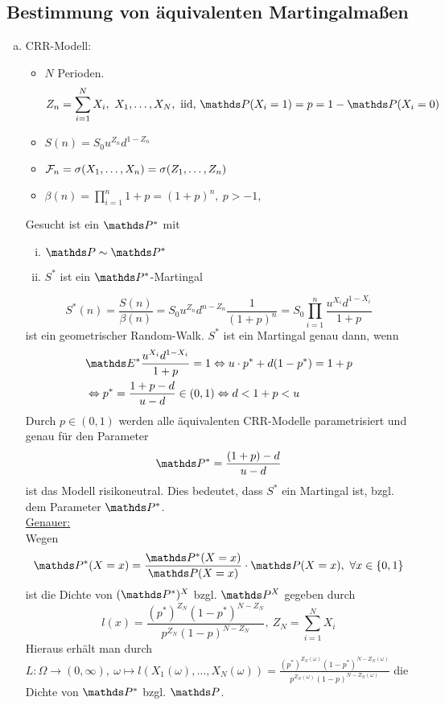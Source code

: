 
\subsection{Bestimmung von äquivalenten Martingalmaßen}
\label{sub:bestimmung_mmase}
\begin{enumerate}[(a)]
	\item CRR-Modell:
	\begin{itemize}
		\item $N$ Perioden.
		\[
		Z_n=\sum_{i=1}^{N}X_i,~X_1,\dots,X_N,\text{ iid, }\Pw(X_i=1)=p=1-\Pw(X_i=0)
		\]
		\item $S(n)=S_0u^{Z_n}d^{1-Z_n}$
		\item $\mathcal{F}_n=\sigma(X_1,\dots,X_n)=\sigma(Z_1,\dots,Z_n)$
		\item $\beta(n)=\prod_{i=1}^{n}1+p=(1+p)^n,~p>-1$,
	\end{itemize}
	Gesucht ist ein $\Pw^*$ mit 
	\begin{enumerate}[(i)]
		\item $\Pw \sim \Pw^*$
		\item $S^*$ ist ein $\Pw^*$-Martingal
	\end{enumerate}
	\[
	S^*(n)=\frac{S(n)}{\beta(n)}=S_0u^{Z_n}d^{n-Z_n}\frac{1}{(1+p)^n}=S_0\prod_{i=1}^{n}\frac{u^{X_i}d^{1-X_i}}{1+p}
	\]
	ist ein geometrischer Random-Walk.
	$S^*$ ist ein Martingal genau dann, wenn
	\begin{equation*}
	\begin{aligned}
		&\E^*\frac{u^{X_i}d^{1-X_i}}{1+p}=1 \Leftrightarrow u\cdot p^*+d(1-p^*)=1+p\\
		&\Leftrightarrow p^*=\frac{1+p-d}{u-d}\in (0,1) \Leftrightarrow d<1+p<u
	\end{aligned}
	\end{equation*}
	Durch $p\in(0,1)$ werden alle äquivalenten CRR-Modelle parametrisiert und genau für den Parameter
	\[
	\Pw^*=\frac{(1+p)-d}{u-d}
	\]
	ist das Modell risikoneutral.
	Dies bedeutet, dass $S^*$ ein Martingal ist, bzgl. dem Parameter $\Pw^*$.\\
	\uline{Genauer:}\\
	Wegen 
	\[
	\Pw^*(X=x)=\frac{\Pw^*(X=x)}{\Pw(X=x)}\cdot \Pw(X=x),~\forall x\in \{0,1\}
	\]
	ist die Dichte von $(\Pw^*)^X$ bzgl. $\Pw^X$ gegeben durch
	\[
	l(x)=\frac{(p^*)^{Z_N}(1-p^*)^{N-Z_N}}{p^{Z_N}(1-p)^{N-Z_N}},~Z_N=\sum_{i=1}^{N}X_i
	\]
	Hieraus erhält man durch $L:\Omega\to(0,\infty),~\omega\mapsto l(X_1(\omega),\dots,X_N(\omega))=\frac{(p^*)^{Z_N(\omega)}(1-p^*)^{N-Z_N(\omega)}}{p^{Z_N(\omega)}(1-p)^{N-Z_N(\omega)}}$ die Dichte von $\Pw^*$ bzgl. $\Pw$.\\

\end{enumerate}
